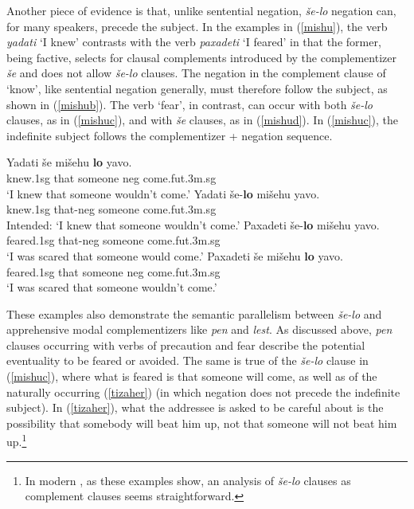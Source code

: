 \documentclass[output=paper,colorlinks,citecolor=brown]{langscibook}
\begin{document}
Another piece of evidence is that, unlike sentential negation, \textit{še-lo} negation can, for many speakers, precede the subject. In the examples in (\ref{mishu}), the verb \textit{yadati} `I knew' contrasts with the verb \textit{paxadeti} `I feared' in that the former, being factive, selects for clausal complements introduced by the complementizer \textit{še} and does not allow \textit{še-lo} clauses. The negation in the complement clause of `know', like  sentential negation generally, must therefore follow the subject, as shown in (\ref{mishub}). The verb `fear', in contrast, can occur with both \textit{še-lo} clauses, as in (\ref{mishuc}), and with \textit{še} clauses, as in (\ref{mishud}). In (\ref{mishuc}), the indefinite subject follows the complementizer + negation sequence.
\ea
\label{mishu}
\begin{xlist}
\ex\label{mishua}
\gll Yadati še mišehu \textbf{lo} yavo. \\
knew.{\sc 1sg} that someone {\sc neg} come.{\sc fut.3m.sg}  \\
\glt `I knew that someone wouldn't come.'
\ex\label{mishub}
\gll *Yadati še-\textbf{lo} mišehu  yavo. \\
knew.{\sc 1sg} that-{\sc neg} someone come.{\sc fut.3m.sg}  \\
\glt Intended: `I knew that someone wouldn't come.'
\ex\label{mishuc}
\gll Paxadeti še-\textbf{lo} mišehu  yavo. \\
feared.{\sc 1sg} that-{\sc neg} someone come.{\sc fut.3m.sg}  \\
\glt `I was scared that someone would come.'
\ex\label{mishud}
\gll Paxadeti še mišehu \textbf{lo} yavo. \\
feared.{\sc 1sg} that someone {\sc neg} come.{\sc fut.3m.sg}  \\
\glt `I was scared that someone wouldn't come.'
\end{xlist}
\z

These examples also demonstrate the semantic parallelism between \textit{še-lo} and apprehensive modal complementizers like \textit{pen} and \textit{lest}. As discussed above, \textit{pen} clauses occurring with verbs of precaution and fear describe the potential eventuality to be feared or avoided. The same is true of the \textit{še-lo} clause in (\ref{mishuc}), where what is feared is that someone will come, as well as of the naturally occurring (\ref{tizaher}) (in which negation does not precede the indefinite subject). In (\ref{tizaher}), what the addressee is asked to be careful about is the possibility that somebody will beat him up, not that someone will not beat him up.\footnote{In modern , as these examples show, an analysis of \textit{še-lo} clauses as complement clauses seems straightforward.}
\end{document}
